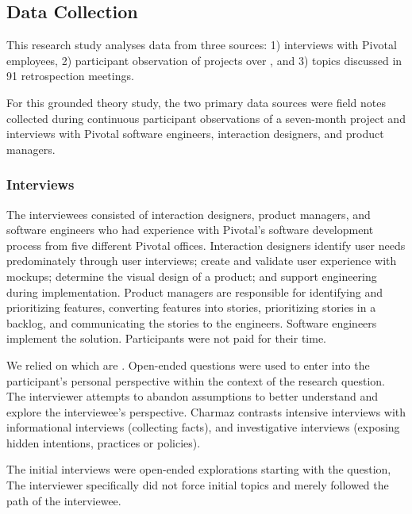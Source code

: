 \subsection{Data Collection}
This research study analyses data from three sources: 1) interviews with Pivotal employees, 2) participant observation of \numberOfObservedProjects{} projects over \durationOfResearchStudyPlural{}, and 3) topics discussed in 91 retrospection meetings. 

For this grounded theory study, the two primary data sources were field notes collected during continuous participant observations of a seven-month project and interviews with Pivotal software engineers, interaction designers, and product managers.

\subsubsection{Interviews}
The interviewees consisted of \numberOfInterviews{} interaction designers, product managers, and software engineers who had experience with Pivotal's software development process from five different Pivotal offices. Interaction designers identify user needs predominately through user interviews; create and validate user experience with mockups; determine the visual design of a product; and support engineering during implementation. Product managers are responsible for identifying and prioritizing features, converting features into stories, prioritizing stories in a backlog, and communicating the stories to the engineers. Software engineers implement the solution. Participants were not paid for their time. 

We relied on  which are  \cite{Charmaz}. Open-ended questions were used to enter into the participant's personal perspective within the context of the research question. The interviewer attempts to abandon assumptions to better understand and explore the interviewee's perspective. Charmaz \cite{Charmaz} contrasts intensive interviews with informational interviews (collecting facts), and investigative interviews (exposing hidden intentions, practices or policies).

The initial interviews were open-ended explorations starting with the question,  The interviewer specifically did not force initial topics and merely followed the path of the interviewee. 

